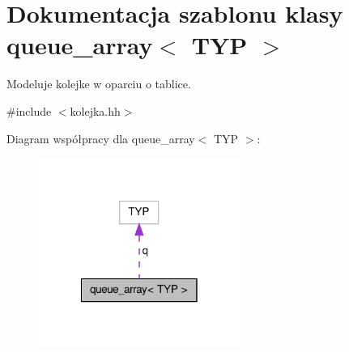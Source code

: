 \hypertarget{classqueue__array}{\section{\-Dokumentacja szablonu klasy queue\-\_\-array$<$ \-T\-Y\-P $>$}
\label{classqueue__array}
}


\-Modeluje kolejke w oparciu o tablice.  




{\ttfamily \#include $<$kolejka.\-hh$>$}



\-Diagram współpracy dla queue\-\_\-array$<$ \-T\-Y\-P $>$\-:\nopagebreak
\begin{figure}[H]
\begin{center}
\leavevmode
\includegraphics[width=186pt]{classqueue__array__coll__graph}
\end{center}
\end{figure}
